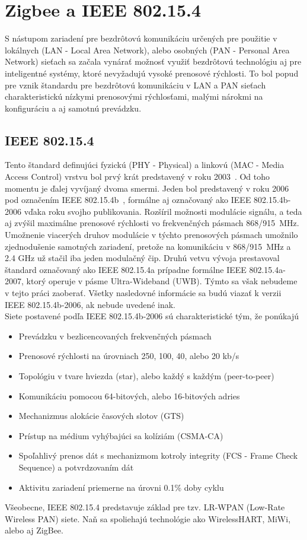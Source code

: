 \chapter{Zigbee a IEEE 802.15.4}

\indent\indent S nástupom zariadení pre bezdrôtovú komunikáciu určených pre použitie v lokálnych (LAN - Local Area Network), alebo osobných (PAN - Personal Area Network) sieťach sa začala vynárať možnosť využiť bezdrôtovú technológiu aj pre inteligentné systémy, ktoré nevyžadujú vysoké prenosové rýchlosti. To bol popud pre vznik štandardu pre bezdrôtovú komunikáciu v LAN a PAN sieťach charakteristickú nízkymi prenosovými rýchlosťami, malými nárokmi na konfiguráciu a aj samotnú prevádzku.\\

\section{IEEE 802.15.4}
\indent\indent Tento štandard definujúci fyzickú (PHY - Physical) a linkovú (MAC - Media Access Control) vrstvu bol prvý krát predstavený v roku 2003~\cite{ieee03}. Od toho momentu je ďalej vyvíjaný dvoma smermi. Jeden bol predstavený v roku 2006 pod označením IEEE 802.15.4b~\cite{ieee06}, formálne aj označovaný ako IEEE 802.15.4b-2006 vďaka roku svojho publikovania. Rozšíril možnosti modulácie signálu, a teda aj zvýšil maximálne prenosové rýchlosti vo frekvenčných pásmach 868/915~MHz. Umožnenie viacerých druhov modulácie v týchto prenosových pásmach umožnilo zjednodušenie samotných zariadení, pretože na komunikáciu v 868/915~MHz a 2.4 GHz už stačil iba jeden modulačný čip. Druhú vetvu vývoja prestavoval štandard označovaný ako IEEE 802.15.4a prípadne formálne IEEE 802.15.4a-2007, ktorý operuje v pásme Ultra-Wideband (UWB). Týmto sa však nebudeme v tejto práci zaoberať. Všetky nasledovné informácie sa budú viazať k verzii IEEE 802.15.4b-2006, ak nebude uvedené inak.\\
\indent Siete postavené podľa IEEE 802.15.4b-2006 sú charakteristické tým, že ponúkajú
\begin{itemize}
\item Prevádzku v bezlicencovaných frekvenčných pásmach
\item Prenosové rýchlosti na úrovniach 250, 100, 40, alebo 20 kb/s
\item Topológiu v tvare hviezda (star), alebo každý s každým (peer-to-peer)
\item Komunikáciu pomocou 64-bitových, alebo 16-bitových adries
\item Mechanizmus alokácie časových slotov (GTS)
\item Prístup na médium vyhýbajúci sa kolíziám (CSMA-CA)
\item Spoľahlivý prenos dát s mechanizmom kotroly integrity (FCS - Frame Check Sequence) a potvrdzovaním dát
\item Aktivitu zariadení priemerne na úrovni 0.1\% doby cyklu
\end{itemize}
\indent Všeobecne, IEEE 802.15.4 predstavuje základ pre tzv. LR-WPAN (Low-Rate Wireless PAN) siete. Naň sa spoliehajú technológie ako WirelessHART, MiWi, alebo aj ZigBee.\\
